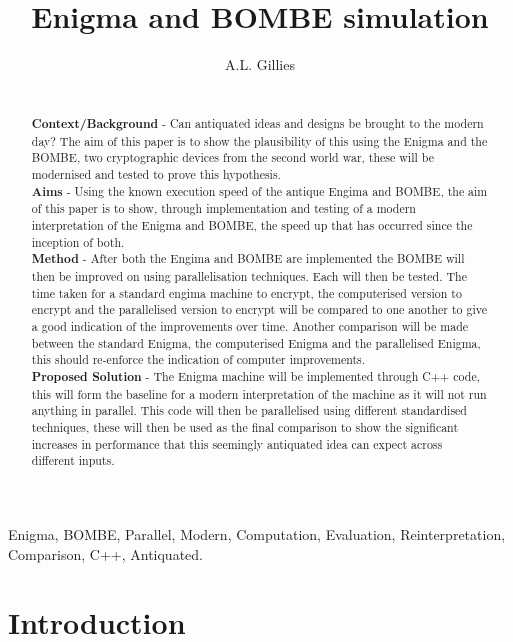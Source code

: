 \documentclass[12pt,a4paper]{article}
\title{Enigma and BOMBE simulation}
\author{A.L. Gillies}
\date{}
\begin{document}
\maketitle

\begin{abstract}\\

{\bf Context/Background} - Can antiquated ideas and designs be brought to the modern day? The aim of this paper is to show the plausibility of this using the Enigma and the BOMBE, two cryptographic devices from the second world war, these will be modernised and tested to prove this hypothesis.\\

{\bf Aims} - Using the known execution speed of the antique Engima and BOMBE, the aim of this paper is to show, through implementation and testing of a modern interpretation of the Enigma and BOMBE, the speed up that has occurred since the inception of both.\\

{\bf Method} - After both the Engima and BOMBE are implemented the BOMBE will then be improved on using parallelisation techniques. Each will then be tested. The time taken for a standard engima machine to encrypt, the computerised version to encrypt and the parallelised version to encrypt will be compared to one another to give a good indication of the improvements over time. Another comparison will be made between the standard Enigma, the computerised Enigma and the parallelised Enigma, this should re-enforce the indication of computer improvements.\\

{\bf Proposed Solution} - The Enigma machine will be implemented through C++ code, this will form the baseline for a modern interpretation of the machine as it will not run anything in parallel. This code will then be parallelised using different standardised techniques, these will then be used as the final comparison to show the significant increases in performance that this seemingly antiquated idea can expect across different inputs.\\
\end{abstract}

\begin{keywords}
Enigma, BOMBE, Parallel, Modern, Computation, Evaluation, Reinterpretation, Comparison, C++, Antiquated.
\end{keywords}



\section{Introduction}
\end{document}
